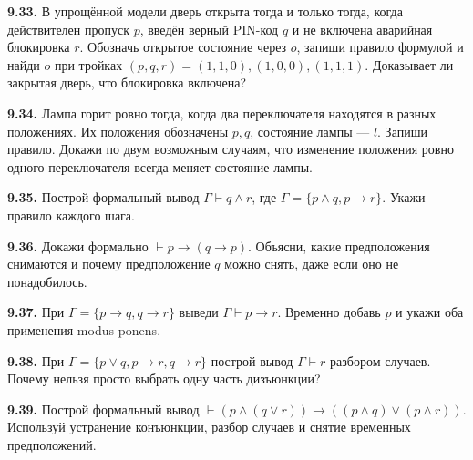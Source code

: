 \noindent\begin{minipage}[t]{\linewidth}\textbf{9.33.} В упрощённой модели дверь открыта тогда и только тогда, когда действителен пропуск \(p\), введён верный PIN-код \(q\) и не включена аварийная блокировка \(r\). Обозначь открытое состояние через \(o\), запиши правило формулой и найди \(o\) при тройках \((p,q,r)=(1,1,0),(1,0,0),(1,1,1)\). Доказывает ли закрытая дверь, что блокировка включена?\par\end{minipage}\par
\noindent\begin{minipage}[t]{\linewidth}\textbf{9.34.} Лампа горит ровно тогда, когда два переключателя находятся в разных положениях. Их положения обозначены \(p,q\), состояние лампы — \(l\). Запиши правило. Докажи по двум возможным случаям, что изменение положения ровно одного переключателя всегда меняет состояние лампы.\par\end{minipage}\par
\noindent\begin{minipage}[t]{\linewidth}\textbf{9.35.} Построй формальный вывод \(\Gamma\vdash q\land r\), где \(\Gamma=\{p\land q,p\to r\}\). Укажи правило каждого шага.\par\end{minipage}\par
\noindent\begin{minipage}[t]{\linewidth}\textbf{9.36.} Докажи формально \(\vdash p\to(q\to p)\). Объясни, какие предположения снимаются и почему предположение \(q\) можно снять, даже если оно не понадобилось.\par\end{minipage}\par
\noindent\begin{minipage}[t]{\linewidth}\textbf{9.37.} При \(\Gamma=\{p\to q,q\to r\}\) выведи \(\Gamma\vdash p\to r\). Временно добавь \(p\) и укажи оба применения modus ponens.\par\end{minipage}\par
\noindent\begin{minipage}[t]{\linewidth}\textbf{9.38.}\starmark{} При \(\Gamma=\{p\lor q,p\to r,q\to r\}\) построй вывод \(\Gamma\vdash r\) разбором случаев. Почему нельзя просто выбрать одну часть дизъюнкции?\par\end{minipage}\par
\noindent\begin{minipage}[t]{\linewidth}\textbf{9.39.}\starmark{} Построй формальный вывод \(\vdash(p\land(q\lor r))\to((p\land q)\lor(p\land r))\). Используй устранение конъюнкции, разбор случаев и снятие временных предположений.\par\end{minipage}\par
